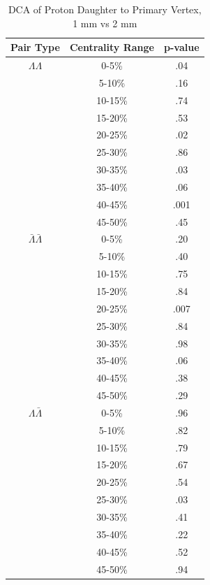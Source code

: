 \begin{table}
\caption {DCA of Proton Daughter to Primary Vertex, 1 mm vs 2 mm} \label{tab:DcaProtonPvalueTests1mmVs2mm}
\begin{center}
\begin{tabular}{| c | c | c |}
  \hline                       
  Pair Type & Centrality Range & p-value \\
  \hline
  $\Lambda\Lambda$ & 0-5\% & .04 \\
   & 5-10\%  & .16 \\
   & 10-15\% & .74 \\
   & 15-20\% & .53 \\
   & 20-25\% & .02 \\
   & 25-30\% & .86 \\
   & 30-35\% & .03 \\
   & 35-40\% & .06 \\
   & 40-45\% & .001 \\
   & 45-50\% & .45 \\
   \hline
  $\bar{\Lambda}\bar{\Lambda}$ &  0-5\% & .20 \\
   & 5-10\% & .40 \\
   & 10-15\% & .75 \\
   & 15-20\% & .84 \\
   & 20-25\% & .007 \\
   & 25-30\% & .84 \\
   & 30-35\% & .98 \\
   & 35-40\% & .06 \\
   & 40-45\% & .38 \\
   & 45-50\% & .29 \\
   \hline
  $\Lambda\bar{\Lambda}$ &  0-5\% & .96 \\
   & 5-10\% & .82 \\
   & 10-15\% & .79 \\
   & 15-20\% & .67 \\
   & 20-25\% & .54 \\
   & 25-30\% & .03 \\
   & 30-35\% & .41 \\
   & 35-40\% & .22 \\
   & 40-45\% & .52 \\
   & 45-50\% & .94 \\
  \hline  
\end{tabular}
\end{center}
\end{table}



